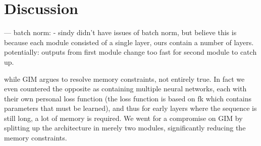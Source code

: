 \documentclass[]{book}
\begin{document}
\newcommand{\R}[0]{\mathbb{R}}

\newcommand{\qzzblank}[0]{q(\cdot \mid \zt^{m-1})}

\newcommand{\latentspaceconstraintgim}[0]{\kl{ \qzzblank }{ \standardnormal } }

\newcommand{\sampleqdot}[1]{q(\cdot \mid #1)}


\newcommand{\reconstrgim}[0]{\sum_k
	\expected{
		\sample{\ztk^m}{\sampleqdot{\ztk^{m-1}} } \\ 
		\sample{\zt^m}{q(\sampleqdot{\zt^{m-1}}} } 
	\left[ \gim \right]
}


\newcommand{\genc}[0]{g_{enc}(\cdot)}
\newcommand{\gencm}[0]{g_{enc}^m(\cdot)}
\newcommand{\gencM}[0]{g_{enc}^M(\cdot)}

\newcommand{\gar}[0]{g_{ar}(\cdot)}

\newcommand{\Lvnce}[0]{\mathcal{L}_{\text{V-NCE}}}
\newcommand{\Lnce}[0]{\mathcal{L}_{\text{NCE}}}

\newcommand{\qfromzmneg}[0]{\sampleqdot{\zt^{m-1}}}
\newcommand{\qfromzm}[0]{\sampleqdot{\zt^m}}
\newcommand{\qfromzM}[0]{\sampleqdot{\zt^M}}

\newcommand{\normalfatmusigma}[0]{\mathcal{N}(\mufat, \text{diag}(\sigmafat^2))}










\chapter{Discussion}

---
batch norm:
 - sindy didn't have issues of batch norm, but believe this is because each module consisted of a single layer, ours contain a number of layers. potentially: outputs from first module change too fast for second module to catch up.




while GIM argues to resolve memory constraints, not entirely true. In fact we even countered the opposite as containing multiple neural networks, each with their own personal loss function (the loss function is based on fk which contains parameters that must be learned), and thus for early layers where the sequence is still long, a lot of memory is required. We went for a compromise on GIM by splitting up the architecture in merely two modules, significantly reducing the memory constraints.
\end{document}
